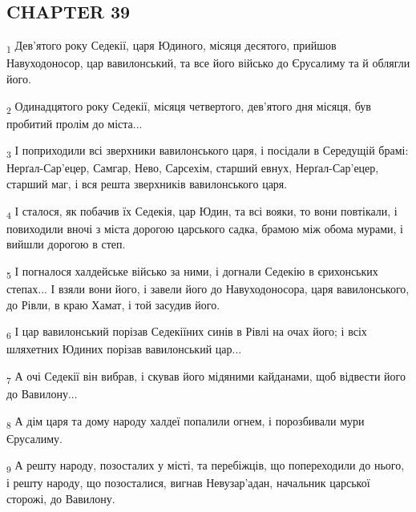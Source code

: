\subsection{CHAPTER 39}
\begin{tcolorbox}
\textsubscript{1} Дев'ятого року Седекії, царя Юдиного, місяця десятого, прийшов Навуходоносор, цар вавилонський, та все його військо до Єрусалиму та й облягли його.
\end{tcolorbox}
\begin{tcolorbox}
\textsubscript{2} Одинадцятого року Седекії, місяця четвертого, дев'ятого дня місяця, був пробитий пролім до міста...
\end{tcolorbox}
\begin{tcolorbox}
\textsubscript{3} І поприходили всі зверхники вавилонського царя, і посідали в Середущій брамі: Нерґал-Сар'ецер, Самгар, Нево, Сарсехім, старший евнух, Нерґал-Сар'ецер, старший маг, і вся решта зверхників вавилонського царя.
\end{tcolorbox}
\begin{tcolorbox}
\textsubscript{4} І сталося, як побачив їх Седекія, цар Юдин, та всі вояки, то вони повтікали, і повиходили вночі з міста дорогою царського садка, брамою між обома мурами, і вийшли дорогою в степ.
\end{tcolorbox}
\begin{tcolorbox}
\textsubscript{5} І погналося халдейське військо за ними, і догнали Седекію в єрихонських степах... І взяли вони його, і завели його до Навуходоносора, царя вавилонського, до Рівли, в краю Хамат, і той засудив його.
\end{tcolorbox}
\begin{tcolorbox}
\textsubscript{6} І цар вавилонський порізав Седекіїних синів в Рівлі на очах його; і всіх шляхетних Юдиних порізав вавилонський цар...
\end{tcolorbox}
\begin{tcolorbox}
\textsubscript{7} А очі Седекії він вибрав, і скував його мідяними кайданами, щоб відвести його до Вавилону...
\end{tcolorbox}
\begin{tcolorbox}
\textsubscript{8} А дім царя та дому народу халдеї попалили огнем, і порозбивали мури Єрусалиму.
\end{tcolorbox}
\begin{tcolorbox}
\textsubscript{9} А решту народу, позосталих у місті, та перебіжців, що попереходили до нього, і решту народу, що позосталися, вигнав Невузар'адан, начальник царської сторожі, до Вавилону.
\end{tcolorbox}
